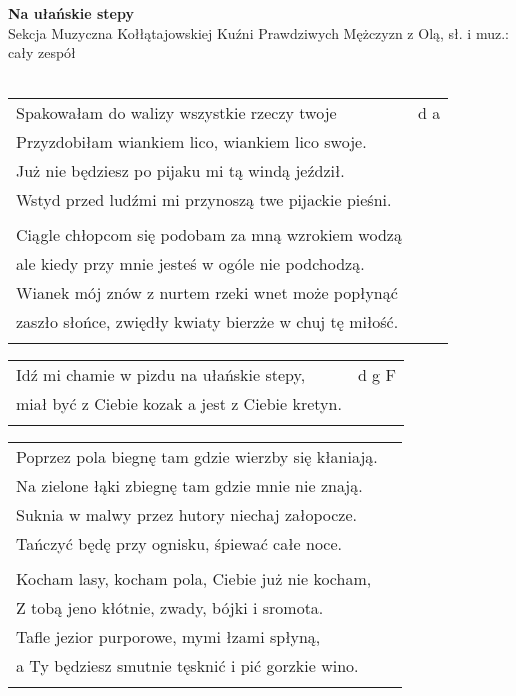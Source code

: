 \documentclass[a5paper]{article}
\begin{document}


\noindent
\fontsize{12pt}{15pt}\selectfont
\textbf{Na ułańskie stepy} \\
\fontsize{8pt}{10pt}\selectfont
Sekcja Muzyczna Kołłątajowskiej Kuźni Prawdziwych Mężczyzn z Olą, sł. i muz.: cały zespół \\ \\
\fontsize{10pt}{12pt}\selectfont
{}
\begin{tabular}{@{}p{9.00cm}p{3cm}@{}}
\noindent
Spakowałam do walizy wszystkie rzeczy twoje & d a \\
Przyzdobiłam wiankiem lico, wiankiem lico swoje. \\
Już nie będziesz po pijaku mi tą windą jeździł. \\
Wstyd przed ludźmi mi przynoszą twe pijackie pieśni. \\ \\

Ciągle chłopcom się podobam za mną wzrokiem wodzą\\
ale kiedy przy mnie jesteś w ogóle nie podchodzą.\\
Wianek mój znów z nurtem rzeki wnet może popłynąć\\
zaszło słońce, zwiędły kwiaty bierzże w chuj tę miłość.\\\\
\end{tabular}

\noindent
\begin{tabular}{@{}p{8.00cm}p{3cm}@{}}
Idź mi chamie w pizdu na ułańskie stepy, & d g F \\
miał być z Ciebie kozak a jest z Ciebie kretyn. \\ \\
\end{tabular}

\noindent
\begin{tabular}{@{}p{8.00cm}p{3cm}@{}}
Poprzez pola biegnę tam gdzie wierzby się kłaniają.\\
Na zielone łąki zbiegnę tam gdzie mnie nie znają.\\
Suknia w malwy przez hutory niechaj załopocze.\\
Tańczyć będę przy ognisku, śpiewać całe noce.\\\\

Kocham lasy, kocham pola, Ciebie już nie kocham,\\
Z tobą jeno kłótnie, zwady, bójki i sromota.\\
Tafle jezior purporowe, mymi łzami spłyną,\\
a Ty będziesz smutnie tęsknić i pić gorzkie wino.\\\\
\end{tabular}
\end{document}
